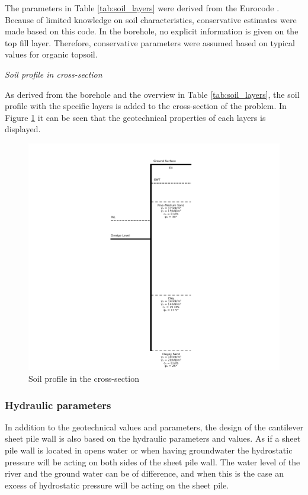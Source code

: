 The parameters in Table \ref{tab:soil_layers} were derived from the Eurocode \autocite{stichtingkoninklijknederlandsnormalisatieinstituutNederlandseNormNEN2025}. Because of limited knowledge on soil characteristics, conservative estimates were made based on this code. In the borehole, no explicit information is given on the top fill layer. Therefore, conservative parameters were assumed based on typical values for organic topsoil.

\textit{Soil profile in cross-section}

As derived from the borehole and the overview in Table \ref{tab:soil_layers}, the soil profile with the specific layers is added to the cross-section of the problem. In Figure \ref{fig:soil_profile_cross_section} it can be seen that the geotechnical properties of each layers is displayed. 

\begin{figure}[H]
    \centering
    \includegraphics[width=0.90\linewidth]{figures/ch8/soil_profile.png}
    \caption{Soil profile in the cross-section}
    \label{fig:soil_profile_cross_section}
\end{figure}

\subsubsection{Hydraulic parameters}

In addition to the geotechnical values and parameters, the design of the cantilever sheet pile wall is also based on the hydraulic parameters and values. As if a sheet pile wall is located in opens water or when having groundwater the hydrostatic pressure will be acting on both sides of the sheet pile wall. The water level of the river and the ground water can be of difference, and when this is the case an excess of hydrostatic pressure will be acting on the sheet pile. 

